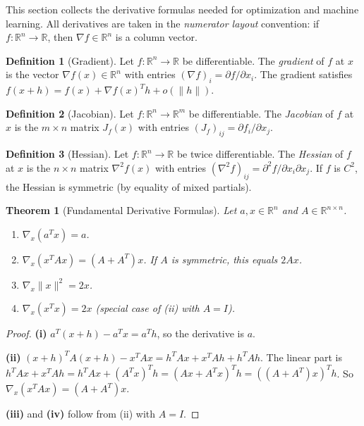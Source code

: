 \documentclass[11pt,a4paper]{article}
\theoremstyle{definition}
\newtheorem{definition}{Definition}[section]
\theoremstyle{plain}
\newtheorem{theorem}{Theorem}[section]
\theoremstyle{remark}
\newcommand{\R}{\mathbb{R}}
\begin{document}
This section collects the derivative formulas needed for optimization and machine learning.
All derivatives are taken in the \emph{numerator layout} convention: if $f: \R^n \to \R$,
then $\nabla f \in \R^n$ is a column vector.

\begin{definition}[Gradient]
\label{def:gradient}
Let $f: \R^n \to \R$ be differentiable. The \emph{gradient} of $f$ at $x$ is the vector
$\nabla f(x) \in \R^n$ with entries $(\nabla f)_i = \partial f / \partial x_i$.
The gradient satisfies $f(x + h) = f(x) + \nabla f(x)^T h + o(\|h\|)$.
\end{definition}

\begin{definition}[Jacobian]
\label{def:jacobian}
Let $f: \R^n \to \R^m$ be differentiable. The \emph{Jacobian} of $f$ at $x$ is the
$m \times n$ matrix $J_f(x)$ with entries $(J_f)_{ij} = \partial f_i / \partial x_j$.
\end{definition}

\begin{definition}[Hessian]
\label{def:hessian}
Let $f: \R^n \to \R$ be twice differentiable. The \emph{Hessian} of $f$ at $x$ is the
$n \times n$ matrix $\nabla^2 f(x)$ with entries $(\nabla^2 f)_{ij} =
\partial^2 f / \partial x_i \partial x_j$. If $f$ is $C^2$, the Hessian is symmetric
(by equality of mixed partials).
\end{definition}

\begin{theorem}[Fundamental Derivative Formulas]
\label{thm:matrix_calc_formulas}
Let $a, x \in \R^n$ and $A \in \R^{n \times n}$.
\begin{enumerate}[nosep,label=(\roman*)]
    \item $\nabla_x (a^T x) = a$.
    \item $\nabla_x (x^T A x) = (A + A^T)x$. If $A$ is symmetric, this equals $2Ax$.
    \item $\nabla_x \|x\|^2 = 2x$.
    \item $\nabla_x (x^T x) = 2x$ (special case of (ii) with $A = I$).
\end{enumerate}
\end{theorem}

\begin{proof}
\textbf{(i)} $a^T(x + h) - a^T x = a^T h$, so the derivative is $a$.

\textbf{(ii)} $(x + h)^T A (x + h) - x^T A x = h^T A x + x^T A h + h^T A h$.
The linear part is $h^T A x + x^T A h = h^T A x + (A^T x)^T h = (Ax + A^T x)^T h
= ((A + A^T)x)^T h$. So $\nabla_x (x^T A x) = (A + A^T)x$.

\textbf{(iii)} and \textbf{(iv)} follow from (ii) with $A = I$.
\end{proof}
\end{document}
